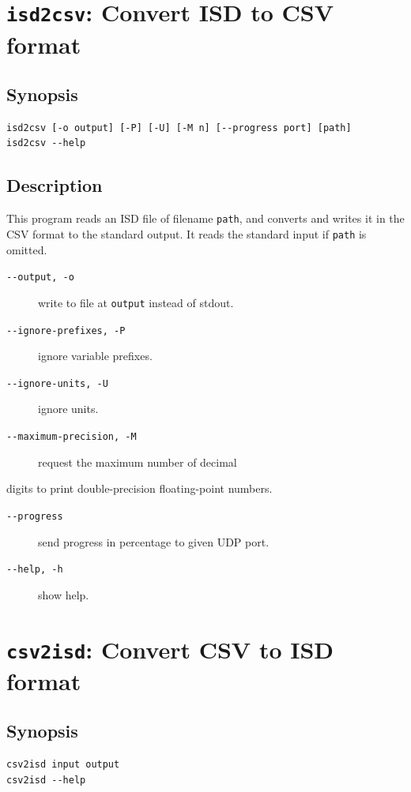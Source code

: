 \documentclass[a4paper,10pt]{report}
\begin{document}
\section{\texttt{isd2csv}: Convert ISD to CSV format}
\label{sec:org85e6111}

\subsection{Synopsis}
\label{sec:org0642518}
\begin{verbatim}
isd2csv [-o output] [-P] [-U] [-M n] [--progress port] [path]
isd2csv --help
\end{verbatim}

\subsection{Description}
\label{sec:orgdece200}
This program reads an ISD file of filename \texttt{path}, and converts and writes
it in the CSV format to the standard output.
It reads the standard input if \texttt{path} is omitted.

\begin{description}
\item[{\texttt{-{}-output, -o}}] write to file at \texttt{output} instead of stdout.
\item[{\texttt{-{}-ignore-prefixes, -P}}] ignore variable prefixes.
\item[{\texttt{-{}-ignore-units, -U}}] ignore units.
\item[{\texttt{-{}-maximum-precision, -M}}] request the maximum number of decimal
\end{description}
digits to print double-precision floating-point numbers.
\begin{description}
\item[{\texttt{-{}-progress}}] send progress in percentage to given UDP port.
\item[{\texttt{-{}-help, -h}}] show help.
\end{description}

\section{\label{orgab1ee78} \texttt{csv2isd}: Convert CSV to ISD format}
\label{sec:org840a1c5}

\subsection{Synopsis}
\label{sec:org2f8b6f9}
\begin{verbatim}
csv2isd input output
csv2isd --help
\end{verbatim}
\end{document}
